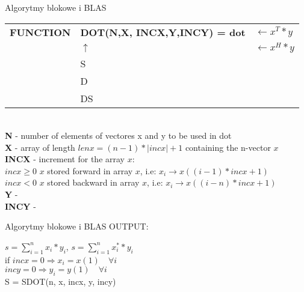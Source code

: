 	\begin{frame}{Algorytmy blokowe i BLAS}
		\begin{tabular}{ l l l }
			\textbf{FUNCTION} & \textunderscore \textbf{DOT(N,X, INCX,Y,INCY) = dot} & $ \leftarrow x^T * y $ \\
			   & $\uparrow$ & $ \leftarrow x^H * y $ \\
			   & S &  \\
			   & D & \\
			   & DS & \\
		\end{tabular} \\ 
		\textbf{N} - number of elements of vectores x and y to be used in dot \\
		\textbf{X} - array of length $lenx = (n - 1) * |inc x| + 1$ containing the n-vector $x$ \\
		\textbf{INCX} - increment for the array $x$: \\
		$\textit{incx} \geq 0 $ $x$ stored forward in array $x$, i.e: $x_i \rightarrow x((i - 1) * incx + 1)$ \\
		$\textit{incx} < 0$ $x$ stored backward in array $x$, i.e: $x_i \rightarrow x((i - n) * incx + 1)$ \\
		\textbf{Y} - \\
		\textbf{INCY} - \\
	\end{frame}
	\begin{frame}{Algorytmy blokowe i BLAS}
		OUTPUT: \\
		\begin{center}
			$s = \sum_{i=1}^n x_i * y_i$, $s = \sum_{i=1}^n x_i^{*} * y_i$ \\
			\vspace{5mm}
			if \quad $incx = 0 \Rightarrow x_i = x(1) \quad \forall i$ \\
			\quad $incy = 0 \Rightarrow y_i = y(1) \quad \forall i$ \\
			\vspace{5mm}
			S = SDOT(n, x, incx, y, incy)
		\end{center}
	\end{frame}
